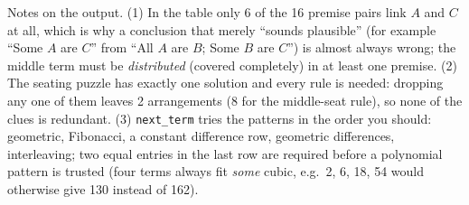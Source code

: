 \documentclass[10pt,a4paper,openany,oneside]{report}
\begin{document}
Notes on the output. (1) In the table only 6 of the 16 premise pairs link $A$ and $C$ at all, which is why a conclusion that merely ``sounds plausible'' (for example ``Some $A$ are $C$'' from ``All $A$ are $B$; Some $B$ are $C$'') is almost always wrong; the middle term must be \emph{distributed} (covered completely) in at least one premise. (2) The seating puzzle has exactly one solution and every rule is needed: dropping any one of them leaves 2 arrangements (8 for the middle-seat rule), so none of the clues is redundant. (3) \texttt{next\_term} tries the patterns in the order you should: geometric, Fibonacci, a constant difference row, geometric differences, interleaving; two equal entries in the last row are required before a polynomial pattern is trusted (four terms always fit \emph{some} cubic, e.g.\ 2, 6, 18, 54 would otherwise give 130 instead of 162).
\end{document}
